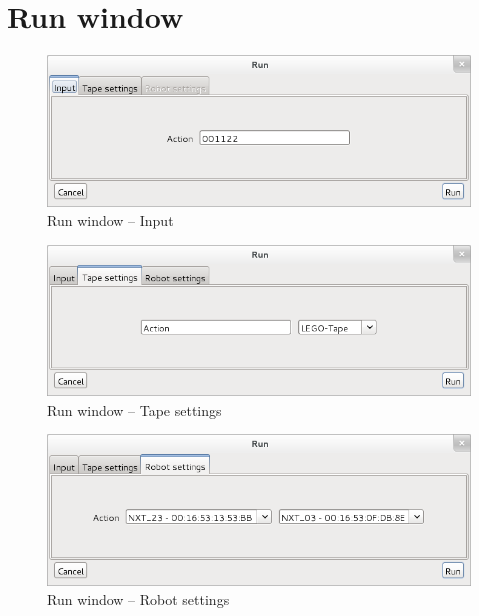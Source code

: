 \documentclass[%
  a4paper,%
  11pt,%
  blue,%
  hyperref	%
  ]{tubsartcl}
\begin{document}
\newpage

\section{Run window}

\begin{figure}[!htb]
\begin{center}
\includegraphics[scale=0.5]{graphics_gui/run_window_input.png}
\end{center}
\caption{Run window -- Input}
\label{pic:run_window_input}
\end{figure}

\newpage

\begin{figure}[!htb]
\begin{center}
\includegraphics[scale=0.5]{graphics_gui/run_window_tape_settings.png}
\end{center}
\caption{Run window -- Tape settings}
\label{pic:run_window_tape_settings}
\end{figure}

\newpage

\begin{figure}[!htb]
\begin{center}
\includegraphics[scale=0.5]{graphics_gui/run_window_robot_settings.png}
\end{center}
\caption{Run window -- Robot settings}
\label{pic:run_window_robot_settings}
\end{figure}
\end{document}
